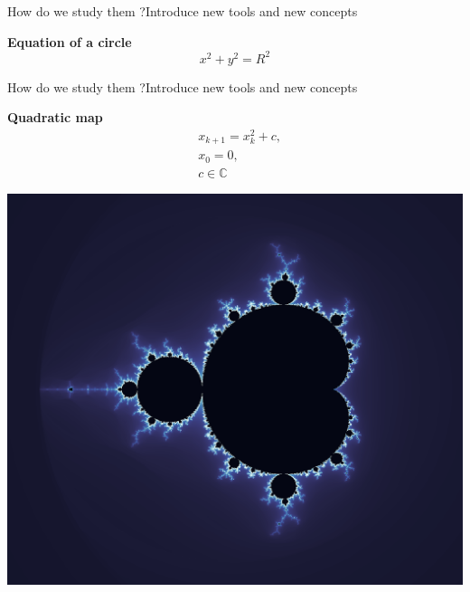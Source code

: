 \documentclass[usenames,dvipsnames,svgnames,10pt,aspectratio=169]{beamer}
\begin{document}
\begin{frame}[t, c]{How do we study them ?}{Introduce new tools and new concepts}
  \begin{minipage}{.48\textwidth}
    \centering
    \textbf{Equation of a circle}
    \[
    x^2 + y^2 = R^2
    \]
    \vspace{0.75cm}
  \end{minipage}%
  \hfill
  \begin{minipage}{.48\textwidth}
    \vspace{-1.5cm}
  \end{minipage}

\end{frame}


\begin{frame}[t, c]{How do we study them ?}{Introduce new tools and new concepts}
  \begin{minipage}{.48\textwidth}
    \centering
    \textbf{Quadratic map}
    \[
    \begin{aligned}
      & x_{k+1} = x_k^2 + c, \\
      & x_0 = 0, \\
      & c \in \mathbb{C}
    \end{aligned}
    \]
  \end{minipage}%
  \hfill
  \begin{minipage}{.48\textwidth}
    \centering
    \includegraphics[width=\textwidth]{Mandelbrot_set}
  \end{minipage}

  \vspace{1cm}
\end{frame}
\end{document}
